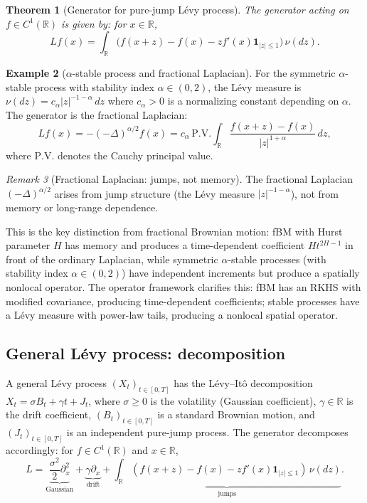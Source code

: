 \documentclass[12pt]{article}
\theoremstyle{plain}
\newtheorem{theorem}{Theorem}[section]
\theoremstyle{definition}
\newtheorem{example}[theorem]{Example}
\theoremstyle{remark}
\newtheorem{remark}[theorem]{Remark}
\newcommand{\R}{\mathbb{R}}
\begin{document}
\begin{theorem}[Generator for pure-jump L\'{e}vy process]\label{thm:Levy-generator}
The generator acting on $f \in C^1(\R)$ is given by: for $x \in \R$,
\begin{equation}\label{eq:Levy-generator-formula}
Lf(x) = \int_{\R} \bigl(f(x+z) - f(x) - zf'(x)\mathbf{1}_{|z| \leq 1}\bigr) \, \nu(dz).
\end{equation}
\end{theorem}

\begin{example}[$\alpha$-stable process and fractional Laplacian]\label{ex:stable}
For the symmetric $\alpha$-stable process with stability index $\alpha \in (0,2)$, the L\'{e}vy measure is $\nu(dz) = c_\alpha |z|^{-1-\alpha} \, dz$ where $c_\alpha > 0$ is a normalizing constant depending on $\alpha$. The generator is the fractional Laplacian:
\begin{equation}\label{eq:fractional-Laplacian}
Lf(x) = -(-\Delta)^{\alpha/2} f(x) = c_\alpha \, \mathrm{P.V.} \int_{\R} \frac{f(x+z) - f(x)}{|z|^{1+\alpha}} \, dz,
\end{equation}
where $\mathrm{P.V.}$ denotes the Cauchy principal value.
\end{example}

\begin{remark}[Fractional Laplacian: jumps, not memory]\label{rmk:fractional-jumps}
The fractional Laplacian $(-\Delta)^{\alpha/2}$ arises from jump structure (the L\'{e}vy measure $|z|^{-1-\alpha}$), not from memory or long-range dependence.

This is the key distinction from fractional Brownian motion: fBM with Hurst parameter $H$ has memory and produces a time-dependent coefficient $Ht^{2H-1}$ in front of the ordinary Laplacian, while symmetric $\alpha$-stable processes (with stability index $\alpha \in (0,2)$) have independent increments but produce a spatially nonlocal operator. The operator framework clarifies this: fBM has an RKHS with modified covariance, producing time-dependent coefficients; stable processes have a L\'{e}vy measure with power-law tails, producing a nonlocal spatial operator.
\end{remark}

\subsection{General L\'{e}vy process: decomposition}

A general L\'{e}vy process $(X_t)_{t \in [0,T]}$ has the L\'{e}vy--It\^{o} decomposition $X_t = \sigma B_t + \gamma t + J_t$, where $\sigma \geq 0$ is the volatility (Gaussian coefficient), $\gamma \in \R$ is the drift coefficient, $(B_t)_{t \in [0,T]}$ is a standard Brownian motion, and $(J_t)_{t \in [0,T]}$ is an independent pure-jump process. The generator decomposes accordingly: for $f \in C^1(\R)$ and $x \in \R$,
\begin{equation}\label{eq:Levy-decomposition}
L = \underbrace{\frac{\sigma^2}{2}\partial_x^2}_{\text{Gaussian}} + \underbrace{\gamma \partial_x}_{\text{drift}} + \underbrace{\int_{\R} (f(x+z) - f(x) - zf'(x)\mathbf{1}_{|z| \leq 1}) \, \nu(dz)}_{\text{jumps}}.
\end{equation}
\end{document}
